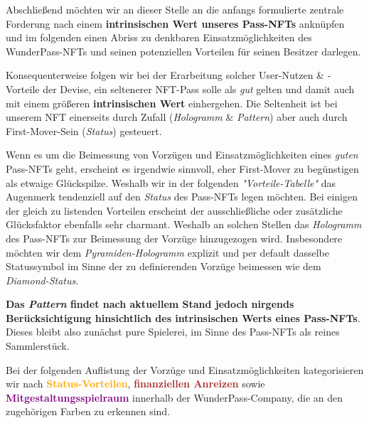 
Abschließend möchten wir an dieser Stelle an die anfangs formulierte zentrale Forderung nach einem \textbf{intrinsischen Wert unseres Pass-NFTs} anknüpfen und im folgenden einen Abriss zu denkbaren Einsatzmöglichkeiten des WunderPass-NFTs und seinen potenziellen Vorteilen für 
seinen Besitzer darlegen.  

\vspace{0.1cm}

Konsequenterweise folgen wir bei der Erarbeitung solcher User-Nutzen \& -Vorteile der Devise, ein seltenerer NFT-Pass solle als \textit{gut} gelten und damit auch mit einem größeren \textbf{intrinsischen Wert} einhergehen. Die Seltenheit ist bei unserem NFT einerseits durch Zufall (\textit{Hologramm} \& \textit{Pattern}) aber auch durch First-Mover-Sein (\textit{Status}) gesteuert. 

Wenn es um die Beimessung von Vorzügen und Einsatzmöglichkeiten eines \textit{guten} Pass-NFTs geht, erscheint es irgendwie sinnvoll, eher First-Mover zu begünstigen als etwaige Glückspilze. Weshalb wir in der folgenden \textit{"Vorteile-Tabelle"} das Augenmerk tendenziell auf den \textit{Status} des Pass-NFTs legen möchten. Bei einigen der gleich \mbox
zu listenden Vorteilen erscheint der ausschließliche oder zusätzliche Glücksfaktor ebenfalls sehr charmant. Weshalb an solchen Stellen das \textit{Hologramm} des Pass-NFTs zur Beimessung der Vorzüge hinzugezogen wird. Insbesondere möchten wir dem \textit{Pyramiden-Hologramm} explizit und per default dasselbe Statussymbol im Sinne der zu definierenden Vorzüge bei\-messen wie dem \textit{Diamond-Status}.

\textbf{Das \textit{Pattern} findet nach aktuellem Stand jedoch nirgends Berücksichtigung hinsichtlich des intrinsischen Werts eines Pass-NFTs}. Dieses bleibt also zunächst pure Spielerei, im Sinne des Pass-NFTs als reines Sammlerstück.

\vspace{0.2cm}

Bei der folgenden Auflistung der Vorzüge und Einsatzmöglichkeiten kategorisieren wir nach 
\textcolor{orange}{\textbf{Status-Vorteilen}}, \textcolor{brown}{\textbf{finanziellen Anreizen}} sowie \textcolor{purple}{\textbf{Mitgestaltungsspielraum}} innerhalb der WunderPass-Company, die an den zugehörigen Farben zu erkennen sind.



\vspace{1.0cm}


